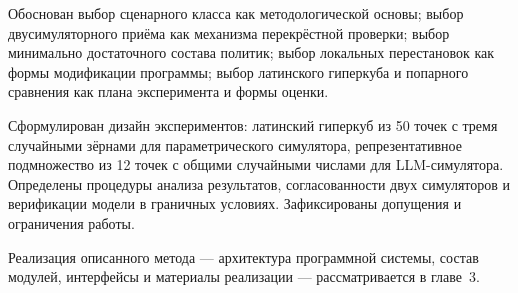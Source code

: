 Обоснован выбор сценарного класса как методологической основы; выбор двусимуляторного приёма как механизма перекрёстной проверки; выбор минимально достаточного состава политик; выбор локальных перестановок как формы модификации программы; выбор латинского гиперкуба и попарного сравнения как плана эксперимента и формы оценки.

Сформулирован дизайн экспериментов: латинский гиперкуб из 50 точек с тремя случайными зёрнами для параметрического симулятора, репрезентативное подмножество из 12 точек с общими случайными числами для LLM-симулятора. Определены процедуры анализа результатов, согласованности двух симуляторов и верификации модели в граничных условиях. Зафиксированы допущения и ограничения работы.

Реализация описанного метода --- архитектура программной системы, состав модулей, интерфейсы и материалы реализации --- рассматривается в главе~3.
